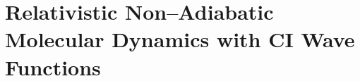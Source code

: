 \linespread{1.0}
\section{Relativistic Non--Adiabatic Molecular Dynamics with CI Wave Functions}
\linespread{1.5}
\label{sec:Future}

